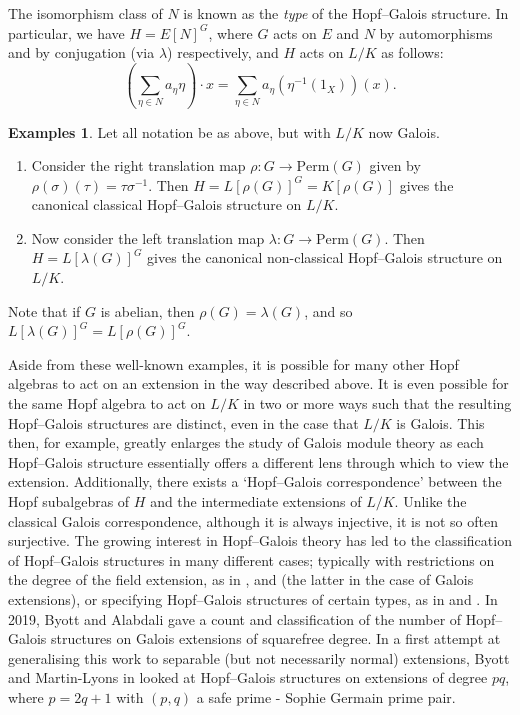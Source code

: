 \documentclass[a4paper,reqno]{amsart}
\theoremstyle{definition}
\newtheorem{examples}[theorem]{Examples}
\begin{document}
The isomorphism class of $N$ is known as the \emph{type} of the Hopf--Galois structure. In particular, we have $H=E[N]^G$, where $G$ acts on $E$ and $N$ by automorphisms and by conjugation (via $\lambda$) respectively, and $H$ acts on $L/K$ as follows:
\[\left(\sum_{\eta \in N}a_{\eta}\eta\right)\cdot x = \sum_{\eta \in N}a_{\eta}(\eta^{-1}(1_X))(x).\]
\begin{examples}
    Let all notation be as above, but with $L/K$ now Galois.
    \begin{enumerate}
        \item Consider the right translation map $\rho: G \rightarrow \text{Perm}(G)$ given by $\rho(\sigma)(\tau)=\tau\sigma^{-1}$. Then $H=L[\rho(G)]^G=K[\rho(G)]$ gives the canonical classical Hopf--Galois structure on $L/K$.
        \item Now consider the left translation map $\lambda: G \rightarrow \text{Perm}(G)$. Then $H=L[\lambda(G)]^G$ gives the canonical non-classical Hopf--Galois structure on $L/K$.
    \end{enumerate}
    Note that if $G$ is abelian, then $\rho(G)=\lambda(G)$, and so $L[\lambda(G)]^G=L[\rho(G)]^G$.
\end{examples}
Aside from these well-known examples, it is possible for many other Hopf algebras to act on an extension in the way described above. It is even possible for the same Hopf algebra to act on $L/K$ in two or more ways such that the resulting Hopf--Galois structures are distinct, even in the case that $L/K$ is Galois. This then, for example, greatly enlarges the study of Galois module theory as each Hopf--Galois structure essentially offers a different lens through which to view the extension. Additionally, there exists a `Hopf--Galois correspondence' between the Hopf subalgebras of $H$ and the intermediate extensions of $L/K$. Unlike the classical Galois correspondence, although it is always injective, it is not so often surjective. The growing interest in Hopf--Galois theory has led to the classification of Hopf--Galois structures in many different cases; typically with restrictions on the degree of the field extension, as in \cite{CS20}, \cite{CS21} and \cite{Byo04} (the latter in the case of Galois extensions), or specifying Hopf--Galois structures of certain types, as in \cite{Kohl98} and \cite{AJ23}. In 2019, Byott and Alabdali \cite{AB20} gave a count and classification of the number of Hopf--Galois structures on Galois extensions of squarefree degree. In a first attempt at generalising this work to separable (but not necessarily normal) extensions, Byott and Martin-Lyons in \cite{BML21} looked at Hopf--Galois structures on extensions of degree $pq$, where $p=2q+1$ with $(p,q)$ a safe prime - Sophie Germain prime pair.
\end{document}
